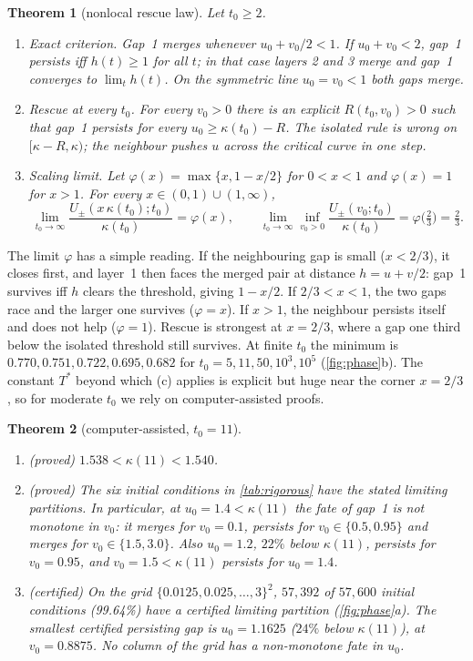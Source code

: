 \documentclass[10pt]{article}
\newtheorem{theorem}{Theorem}
\theoremstyle{definition}
\theoremstyle{remark}
\begin{document}
\begin{theorem}[nonlocal rescue law]\label{thm:rescue}
Let $t_0\ge2$.
\begin{enumerate}[label=(\alph*),leftmargin=2em,itemsep=1pt]
\item \emph{Exact criterion.} Gap~1 merges whenever $u_0+v_0/2<1$. If $u_0+v_0<2$, gap~1 persists iff $h(t)\ge1$ for all $t$; in that
case layers 2 and 3 merge and gap~1 converges to $\lim_th(t)$. On the symmetric line $u_0=v_0<1$ both gaps merge.
\item \emph{Rescue at every $t_0$.} For every $v_0>0$ there is an explicit $R(t_0,v_0)>0$ such that gap~1 persists for every
$u_0\ge\kappa(t_0)-R$. The isolated rule is wrong on $[\kappa-R,\kappa)$; the neighbour pushes $u$ across the critical curve in one step.
\item \emph{Scaling limit.} Let $\varphi(x)=\max\{x,1-x/2\}$ for $0<x<1$ and $\varphi(x)=1$ for $x>1$. For every $x\in(0,1)\cup(1,\infty)$,
\[
\lim_{t_0\to\infty}\frac{U_\pm(x\,\kappa(t_0);t_0)}{\kappa(t_0)}=\varphi(x),\qquad
\lim_{t_0\to\infty}\inf_{v_0>0}\frac{U_\pm(v_0;t_0)}{\kappa(t_0)}=\varphi\big(\tfrac23\big)=\tfrac23 .
\]
\end{enumerate}
\end{theorem}

The limit $\varphi$ has a simple reading. If the neighbouring gap is small ($x<2/3$), it closes first, and layer~1 then faces the merged
pair at distance $h=u+v/2$: gap~1 survives iff $h$ clears the threshold, giving $1-x/2$. If $2/3<x<1$, the two gaps race and the larger
one survives ($\varphi=x$). If $x>1$, the neighbour persists itself and does not help ($\varphi=1$). Rescue is strongest at $x=2/3$, where a
gap one third below the isolated threshold still survives. At finite $t_0$ the minimum is $0.770,0.751,0.722,0.695,0.682$ for
$t_0=5,11,50,10^3,10^5$ (\cref{fig:phase}b). The constant $T^*$ beyond which (c) applies is explicit but huge near the corner $x=2/3$, so
for moderate $t_0$ we rely on computer-assisted proofs.

\begin{theorem}[computer-assisted, $t_0=11$]\label{thm:cap}
\begin{enumerate}[label=(\alph*),leftmargin=2em,itemsep=1pt]
\item (proved) $1.538<\kappa(11)<1.540$.
\item (proved) The six initial conditions in \cref{tab:rigorous} have the stated limiting partitions. In particular, at $u_0=1.4<\kappa(11)$
the fate of gap~1 is not monotone in $v_0$: it merges for $v_0=0.1$, persists for $v_0\in\{0.5,0.95\}$ and merges for
$v_0\in\{1.5,3.0\}$. Also $u_0=1.2$, $22\%$ below $\kappa(11)$, persists for $v_0=0.95$, and $v_0=1.5<\kappa(11)$ persists for $u_0=1.4$.
\item (certified) On the grid $\{0.0125,0.025,\dots,3\}^2$, $57{,}392$ of $57{,}600$ initial conditions (99.64\%) have a certified
limiting partition (\cref{fig:phase}a). The smallest certified persisting gap is $u_0=1.1625$ ($24\%$ below $\kappa(11)$), at
$v_0=0.8875$. No column of the grid has a non-monotone fate in $u_0$.
\end{enumerate}
\end{theorem}
\end{document}
